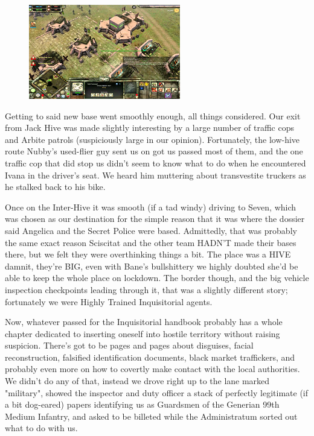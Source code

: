 \begin{figure}
	\begin{center}
		\includegraphics[width=\figwidth]{pics/19/19.png}
	\end{center}
\end{figure}
Getting to said new base went smoothly enough, all things considered. 
Our exit from Jack Hive was made slightly interesting by a large number of traffic cops and Arbite patrols (suspiciously large in our opinion). 
Fortunately, the low-hive route Nubby's used-flier guy sent us on got us passed most of them, and the one traffic cop that did stop us didn't seem to know what to do when he encountered Ivana in the driver's seat. 
We heard him muttering about transvestite truckers as he stalked back to his bike.

Once on the Inter-Hive it was smooth (if a tad windy) driving to Seven, which was chosen as our destination for the simple reason that it was where the dossier said Angelica and the Secret Police were based. 
Admittedly, that was probably the same exact reason Sciscitat and the other team HADN'T made their bases there, but we felt they were overthinking things a bit. 
The place was a HIVE damnit, they're BIG, even with Bane's bullshittery we highly doubted she'd be able to keep the whole place on lockdown. 
The border though, and the big vehicle inspection checkpoints leading through it, that was a slightly different story; 
fortunately we were Highly Trained Inquisitorial agents.

Now, whatever passed for the Inquisitorial handbook probably has a whole chapter dedicated to  inserting oneself into hostile territory without raising suspicion. 
There's got to be pages and pages about disguises, facial reconstruction, falsified identification documents, black market traffickers, and probably even more on how to covertly make contact with the local authorities. 
We didn't do any of that, instead we drove right up to the lane marked "military", showed the inspector and duty officer a stack of perfectly legitimate (if a bit dog-eared) papers identifying us as Guardsmen of the Generian 99th Medium Infantry, and asked to be billeted while the Administratum sorted out what to do with us.

